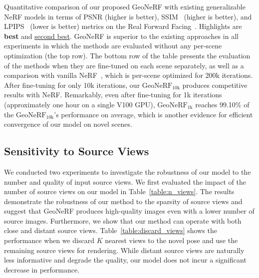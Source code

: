 \begin{table}[!t]
    \caption{Quantitative comparison of our proposed GeoNeRF with existing generalizable NeRF models in terms of PSNR (higher is better), SSIM~\citep{wang2004image} (higher is better), and LPIPS~\citep{zhang2018unreasonable} (lower is better) metrics on the Real Forward Facing~\citep{mildenhall2019llff}. Highlights are \textbf{best} and \underline{second best}. GeoNeRF is superior to the existing approaches in all experiments in which the methods are evaluated without any per-scene optimization (the top row). The bottom row of the table presents the evaluation of the methods when they are fine-tuned on each scene separately, as well as a comparison with vanilla NeRF~\citep{mildenhall2020nerf}, which is per-scene optimized for 200k iterations. After fine-tuning for only 10k iterations, our $\text{GeoNeRF}_{\text{10k}}$ produces competitive results with NeRF. Remarkably, even after fine-tuning for 1k iterations (approximately one hour on a single V100 GPU), $\text{GeoNeRF}_{\text{1k}}$ reaches 99.10\% of the $\text{GeoNeRF}_{\text{10k}}$'s performance on average, which is another evidence for efficient convergence of our model on novel scenes.}
    \label{table:quantitative_llff}
\end{table}

\subsection{Sensitivity to Source Views} \label{sec:c3_sensitivity}
We conducted two experiments to investigate the robustness of our model to the number and quality of input source views. We first evaluated the impact of the number of source views on our model in Table~\ref{table:n_views}. The results demonstrate the robustness of our method to the sparsity of source views and suggest that GeoNeRF produces high-quality images even with a lower number of source images. Furthermore, we show that our method can operate with both close and distant source views. Table~\ref{table:discard_views} shows the performance when we discard $K$ nearest views to the novel pose and use the remaining source views for rendering. While distant source views are naturally less informative and degrade the quality, our model does not incur a significant decrease in performance.

